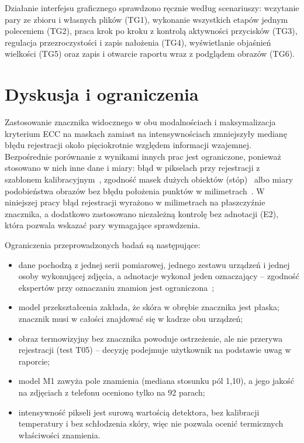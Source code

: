 Działanie interfejsu graficznego sprawdzono ręcznie według scenariuszy: wczytanie pary ze zbioru i własnych plików (TG1), wykonanie wszystkich etapów jednym poleceniem (TG2), praca krok po kroku z kontrolą aktywności przycisków (TG3), regulacja przezroczystości i zapis nałożenia (TG4), wyświetlanie objaśnień wielkości (TG5) oraz zapis i otwarcie raportu wraz z podglądem obrazów (TG6). %

\section{Dyskusja i ograniczenia}
\label{sec:dyskusja}

Zastosowanie znacznika widocznego w obu modalnościach i maksymalizacja kryterium ECC na maskach zamiast na intensywnościach zmniejszyły medianę błędu rejestracji około pięciokrotnie względem informacji wzajemnej. Bezpośrednie porównanie z wynikami innych prac jest ograniczone, ponieważ stosowano w nich inne dane i miary: błąd w pikselach przy rejestracji z szablonem kalibracyjnym~\cite{non-contact-breathing-monitoring}, zgodność masek dużych obiektów (stóp)~\cite{gonzalezperez2021} albo miary podobieństwa obrazów bez błędu położenia punktów w milimetrach~\cite{oniga2026}. W niniejszej pracy błąd rejestracji wyrażono w milimetrach na płaszczyźnie znacznika, a dodatkowo zastosowano niezależną kontrolę bez adnotacji (E2), która pozwala wskazać pary wymagające sprawdzenia.

Ograniczenia przeprowadzonych badań są następujące:
\begin{itemize}
  \item dane pochodzą z jednej serii pomiarowej, jednego zestawu urządzeń i jednej osoby wykonującej zdjęcia, a adnotacje wykonał jeden oznaczający -- zgodność ekspertów przy oznaczaniu znamion jest ograniczona~\cite{codella2019};
  \item model przekształcenia zakłada, że skóra w obrębie znacznika jest płaska; znacznik musi w całości znajdować się w kadrze obu urządzeń;
  \item obraz termowizyjny bez znacznika powoduje ostrzeżenie, ale nie przerywa rejestracji (test T05) -- decyzję podejmuje użytkownik na podstawie uwag w raporcie;
  \item model M1 zawyża pole znamienia (mediana stosunku pól 1,10), a jego jakość na zdjęciach z telefonu oceniono tylko na 92 parach;
  \item intensywność pikseli jest surową wartością detektora, bez kalibracji temperatury i bez schłodzenia skóry, więc nie pozwala ocenić termicznych właściwości znamienia.
\end{itemize}
